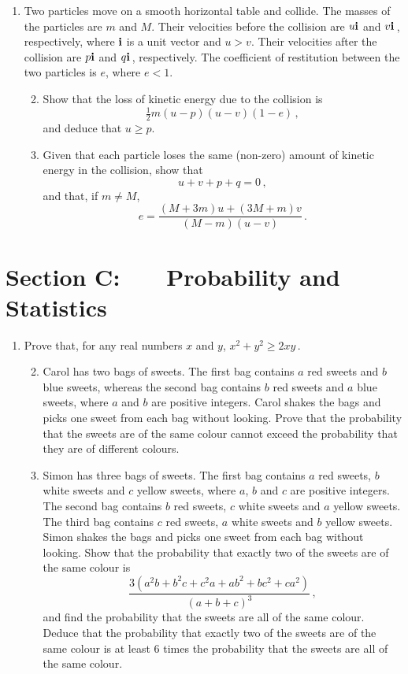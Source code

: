 \documentclass[a4, 11pt]{report}
\newlength{\qspace}
\newcounter{qnumber}
\newenvironment{question}%
 {\vspace{\qspace}
  \begin{enumerate}[\bfseries 1\quad][10]%
    \setcounter{enumi}{\value{qnumber}}%
    \item%
 }
{
  \end{enumerate}
  \filbreak
  \stepcounter{qnumber}
 }
\newenvironment{questionparts}[1][1]%
 {
  \begin{enumerate}[\bfseries (i)]%
    \setcounter{enumii}{#1}
    \addtocounter{enumii}{-1}
    \setlength{\itemsep}{5mm}
    \setlength{\parskip}{8pt}
 }
 {
  \end{enumerate}
 }
\def\ge{\geqslant}
\begin{document}
\begin{question}
Two particles 
move on a smooth horizontal table and collide. 
The  masses of the particles are $m$ and $M$.  Their 
velocities before the collision are $u{\bf i}$ and $v{\bf i}\,$, 
respectively, where $\bf i$ is a unit vector and $u>v$.  
Their velocities  after the collision are $p{\bf i}$ and $q{\bf i}\,$, 
respectively.
The coefficient of 
restitution between the two particles is $e$, where $e<1$. 

\begin{questionparts}
\item Show that the 
loss of kinetic energy due to the collision is
\[
\tfrac12 m (u-p)(u-v)(1-e)\,,
\]
and deduce that $u\ge p$.

\item
Given that each particle loses the same (non-zero)
amount of kinetic energy in
the collision, show that
\[
u+v+p+q=0\,,
\]
and that, if $m\ne M$, 
\[
e= \frac{(M+3m)u + (3M+m)v}{(M-m)(u-v)}\,.
\]

\end{questionparts}
\end{question}
	

	
	\newpage
\section*{Section C: \ \ \ Probability and Statistics}


\begin{question}
Prove that, for any real numbers $x$ and $y$, $x^2+y^2\ge2xy\,$.

\begin{questionparts}
\item Carol has two bags of sweets. The first bag contains $a$ red sweets  
and $b$ blue sweets, whereas the second bag contains $b$ red sweets   and
$a$ blue  sweets, where $a$ and $b$ are positive integers. Carol shakes
the bags and picks
one sweet from each bag without looking. Prove that the probability
that
the sweets  are of the same colour 
cannot exceed  the probability that
they are of different colours.
\item Simon has three bags of sweets. The first bag
contains
$a$ red sweets, $b$ white sweets and $c$ yellow sweets, where $a$, $b$ and
$c$ are positive integers. The second
bag contains
$b$ red sweets, $c$ white sweets and $a$ yellow sweets. The third
bag contains
$c$ red sweets, $a$ white sweets and $b$ yellow sweets.
Simon shakes the bags and 
picks one sweet from each bag without looking.
Show that the probability that exactly two of the sweets are of the 
same colour is
\[
\frac {3(a^2b+b^2c+c^2a+ab^2 + bc^2 +ca^2)}{(a+b+c)^3}\,,
\]
and find the probability that the sweets are all of the same colour.
Deduce that the probability that exactly two of 
the sweets are of the same colour is at least 6 times the probability
that the sweets are all of the same colour.
\end{questionparts}
\end{question}
\end{document}
